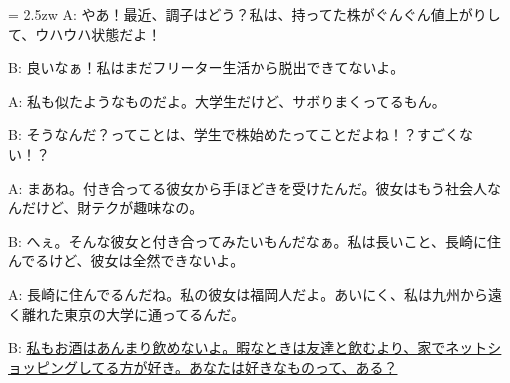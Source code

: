 \documentclass[11pt]{amsart}
\title{}
\author{}
\newenvironment{hangall}[1]{\hangindent = 2.5zw\everypar{\hangindent = 2.5zw}}{}
\begin{document}
\maketitle
\begin{hangall}{}%
A: やあ！最近、調子はどう？私は、持ってた株がぐんぐん値上がりして、ウハウハ状態だよ！

B: 良いなぁ！私はまだフリーター生活から脱出できてないよ。

A: 私も似たようなものだよ。大学生だけど、サボりまくってるもん。

B: そうなんだ？ってことは、学生で株始めたってことだよね！？すごくない！？

A: まあね。付き合ってる彼女から手ほどきを受けたんだ。彼女はもう社会人なんだけど、財テクが趣味なの。

B: へぇ。そんな彼女と付き合ってみたいもんだなぁ。私は長いこと、長崎に住んでるけど、彼女は全然できないよ。

A: 長崎に住んでるんだね。私の彼女は福岡人だよ。あいにく、私は九州から遠く離れた東京の大学に通ってるんだ。

B: \ul{私もお酒はあんまり飲めないよ。暇なときは友達と飲むより、家でネットショッピングしてる方が好き。あなたは好きなものって、ある？}\end{hangall}
\end{document}
